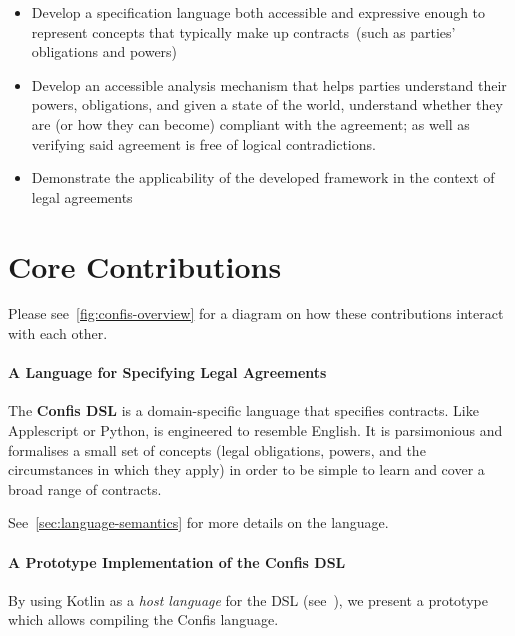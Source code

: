 \begin{itemize}


    \item Develop a specification language both accessible and expressive enough to represent concepts that typically make up contracts~(such as parties' obligations and powers)

    \item Develop an accessible analysis mechanism that helps parties understand their powers, obligations, and given a state of the world, understand whether they are (or how they can become) compliant with the agreement;
    as well as verifying said agreement is free of logical contradictions.

    \item Demonstrate the applicability of the developed framework in the context of legal agreements
\end{itemize}


\section{Core Contributions}\label{sec:core-contributions}

Please see~\autoref{fig:confis-overview} for a diagram on how these contributions interact with each other.

\paragraph{A Language for Specifying Legal Agreements}
The \textbf{Confis DSL} is a domain-specific language that specifies contracts.
Like Applescript or Python, is engineered to resemble English.
It is parsimonious and formalises a small set of concepts (legal obligations, powers, and the circumstances in which they apply) in order to be simple to learn and cover a broad range of contracts.

See~\autoref{sec:language-semantics} for more details on the language.

\paragraph{A Prototype Implementation of the Confis DSL}
By using Kotlin as a \emph{host language} for the DSL (see~), we present a prototype which allows compiling the Confis language.

